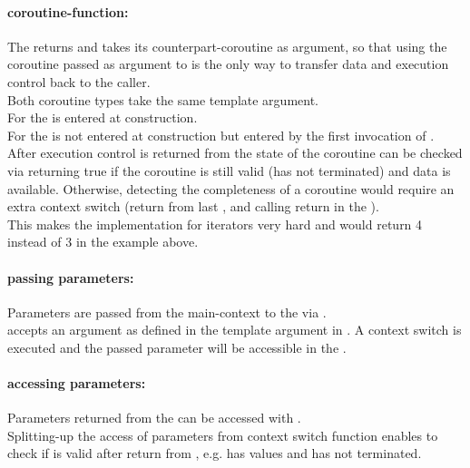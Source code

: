 \paragraph*{coroutine-function:}
The \corofunction returns  and takes its counterpart-coroutine as
argument, so that using the coroutine passed as argument to \corofunction is the
only way to transfer data and execution control back to the caller.\\
Both coroutine types take the same template argument.\\
For \pullcoro the \corofunction is entered at \pullcoro construction.\\
For \pushcoro the \corofunction is not entered at \pushcoro construction but
entered by the first invocation of \pushcoroop.\\
After execution control is returned from \corofunction the state of the
coroutine can be checked via \pullcorobool returning true if the coroutine is
still valid (\corofunction has not terminated) and data is available.
Otherwise, detecting the completeness of a coroutine would require an extra context
switch (return from last \pullcoroop, \pushcoroop and calling return in the \corofunction).\\
This makes the implementation for iterators very hard and 
would return 4 instead of 3 in the example above.

\paragraph*{passing parameters:}
Parameters are passed from the main-context to the \corofunction via
\pushcoroop.\\
\newline
\pushcoroop accepts an argument as defined in the template argument in
\pushcoro.
A context switch is executed and the passed parameter will be accessible in
the \corofunction.

\paragraph*{accessing parameters:}
Parameters returned from the \corofunction can be accessed with
\pullcoroget.\\
\newline
Splitting-up the access of parameters from context switch function enables to
check if \pullcoro is valid after return from \pullcoroop, e.g. \pullcoro has
values and \corofunction has not terminated.

